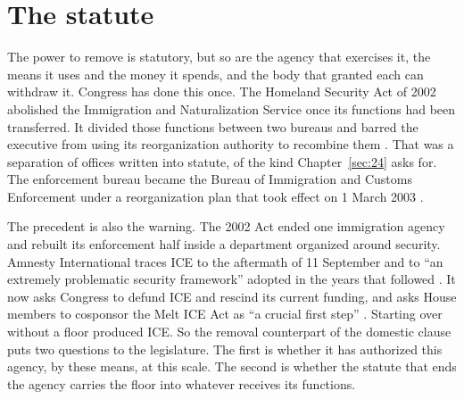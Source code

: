 \section{The statute}
\label{sec:9.4}
The power to remove is statutory, but so are the agency that exercises it, the means it uses and the money it spends, and the body that granted each can withdraw it. Congress has done this once. The Homeland Security Act of 2002 abolished the Immigration and Naturalization Service once its functions had been transferred. It divided those functions between two bureaus and barred the executive from using its reorganization authority to recombine them \autocite[§§442, 451, 471]{hsa2002}. That was a separation of offices written into statute, of the kind Chapter~\ref{sec:24} asks for. The enforcement bureau became the Bureau of Immigration and Customs Enforcement under a reorganization plan that took effect on 1 March 2003 \autocite{hdoc108_32}.

The precedent is also the warning. The 2002 Act ended one immigration agency and rebuilt its enforcement half inside a department organized around security. Amnesty International traces ICE to the aftermath of 11 September and to “an extremely problematic security framework” adopted in the years that followed \autocite{Amnesty2026PressRelease}. It now asks Congress to defund ICE and rescind its current funding, and asks House members to cosponsor the Melt ICE Act as “a crucial first step” \autocite{AmnestyUSA2026Letter}. Starting over without a floor produced ICE. So the removal counterpart of the domestic clause puts two questions to the legislature. The first is whether it has authorized this agency, by these means, at this scale. The second is whether the statute that ends the agency carries the floor into whatever receives its functions.
